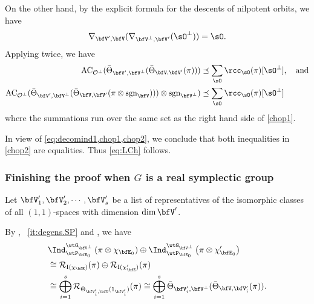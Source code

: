 \documentclass[12pt,a4paper]{amsart}
\newcommand{\AC}{\mathrm{AC}}
\def\AC{\mathrm{AC}}
\newcommand{\CO}{{\mathcal {O}}}
\newcommand{\CR}{{\mathcal {R}}}
\newcommand{\RI}{{\mathrm {I}}}
\newcommand{\sgn}{\operatorname{sgn}}
\def\DD{\nabla}
\numberwithin{equation}{section}
\newtheorem{lem}[thm]{Lemma}
\theoremstyle{remark}
\def\abfV{\bfV'}
\def\Thetab{\bar{\Theta}}
\def\bfVpe{\bfV^\perp}
\begin{document}
  On the other hand, by the explicit formula for the descents  of nilpotent orbits,
  we have
  \[
    \DD_{\abfV,\bfV} (\DD_{\bfVpe,\abfV}(\sO^\perp))=\sO.
  \]
  Applying  twice, we have
  \begin{equation}
    \label{chop2}
    \begin{split}
      \AC_{ \CO^\perp}(\Thetab_{\abfV,\bfVpe}(\Thetab_{\bfV,\abfV}(\pi))) &\preceq
      \sum_{\sO} \rcc_\sO(\pi) [\sO^\perp ], \quad \text{and}\\
      \AC_{ \CO^\perp} (\Thetab_{\abfV,\bfVpe}(\Thetab_{\bfV,\abfV}(\pi\otimes
      \sgn_{\bfV})))\otimes \sgn_{\bfV^\perp}) &\preceq \sum_{\sO}
      \rcc_\sO(\pi) [\sO^\perp ]
    \end{split}
  \end{equation}
  where the summations  run over the same set as the right hand side of \cref{chop1}.

In view of \cref{eq:decomind1,chop1,chop2}, we conclude that both inequalities in \eqref{chop2} are equalities. Thus \eqref{eq:LCh} follows. %

\subsubsection{Finishing the proof when $G$ is a real symplectic group}\label{sec:PC.rsp}
Let $\abfV_1, \abfV_2, \cdots, \abfV_s$ be a list of representatives of the
isomorphic  classes of all $(1,1)$-spaces %
with dimension $\dim \abfV$.


By , ~\ref{it:degens.SP} and , we have
\begin{equation}
\label{decomind2}
\begin{split}
  & \Ind_{\wtP_{\bfE_0}}^{\wtG_{\bfVpe}} \left(\pi\otimes \chi_{\bfE_0}\right)
  \oplus \Ind_{\wtP_{\bfE_0}}^{\wtG_{\bfVpe}} \left(\pi\otimes \chi'_{\bfE_0}\right)\\
 &\cong \CR_{\RI(\chi_{\bfE})} (\pi)\oplus \CR_{\RI(\chi'_{\bfE})} (\pi)\\
 &\cong \bigoplus_{i=1}^s \CR_{\Thetab_{\abfV_i,\bfU}(1_{\abfV_i})}(\pi)
 \cong \bigoplus_{i=1}^s \Thetab_{\abfV_i,\bfVpe}(\Thetab_{\bfV,\abfV_i}(\pi)).
\end{split}
\end{equation}
\end{document}
